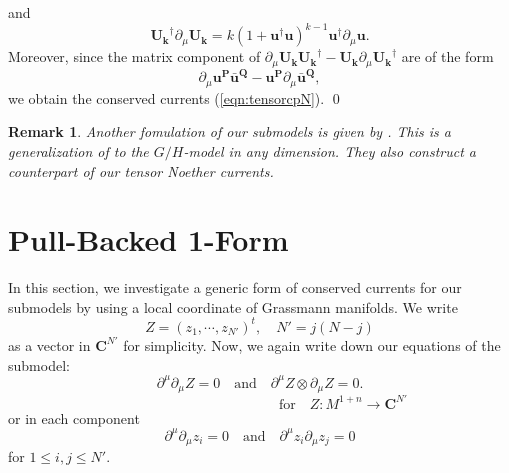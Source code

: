 \documentclass[makeidx,12pt,openany]{report}
\newtheorem{rmk}[df]{Remark}
\begin{document}
and 
$$
\mathbf{U_k}^{\dag}\partial_{\mu}\mathbf{U_k}
=k(1+\mathbf{u}^{\dag}\mathbf{u})^{k-1}
  \mathbf{u}^{\dag}\partial_{\mu}\mathbf{u}. 
$$
Moreover, since the matrix component of 
$\partial_{\mu}\mathbf{U_k}\mathbf{U_k}^{\dag}
    -\mathbf{U_k}\partial_{\mu}\mathbf{U_k}^{\dag} $
are of the form 
\begin{equation}
\partial_{\mu}{\mathbf{u}}^{\mathbf{P}}\bar{\mathbf{u}}^{\mathbf{Q}}
      -{\mathbf{u}}^{\mathbf{P}}\partial_{\mu}\bar{\mathbf{u}}^{\mathbf{Q}}, 
\end{equation}
we obtain the conserved currents (\ref{eqn:tensorcpN}). \qed 
\begin{rmk}
Another fomulation of our submodels is given by \cite{FL}. This is a 
generalization of \cite{AFG1} to the $G/H$-model in any dimension. 
They also construct a counterpart of our tensor Noether currents. 
\end{rmk}
 \section{Pull-Backed 1-Form}
In this section, we investigate a generic form of conserved currents for 
our submodels 
by using a local coordinate of Grassmann manifolds. We write
\begin{equation}
 Z=(z_1,\cdots,z_{N'})^t, \quad N'=j(N-j)
\end{equation}
as a vector in ${\mathbf{C}}^{N'}$ for simplicity. 
Now, we again write down our equations of the submodel:
\begin{equation}
 \partial^{\mu}\partial_{\mu}Z=0 \quad \mbox{and} \quad 
 \partial^{\mu}Z \otimes \partial_{\mu}Z=0.
\end{equation}
$$ \hspace{5cm} \mbox{for} \quad
 Z:M^{1+n} \longrightarrow {\mathbf{C}}^{N'}
$$
or in each component
\begin{equation}
 \partial^{\mu}\partial_{\mu}z_i=0 \quad \mbox{and} \quad 
 \partial^{\mu}z_i \partial_{\mu}z_j=0
 \label{eqn:1-13}
\end{equation}
for $1 \le i,j \le {N'}$.
\end{document}
